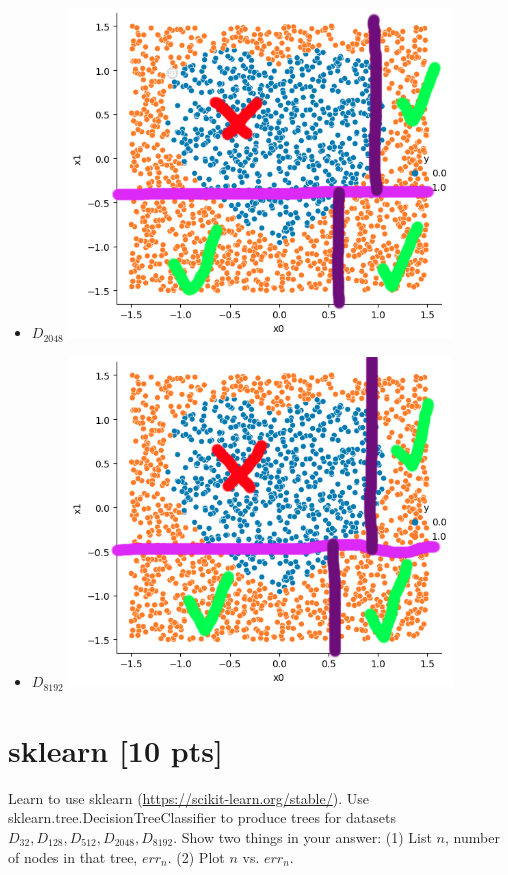 \documentclass[a4paper]{article}
\theoremstyle{definition}
\begin{document}
\begin{enumerate}
\begin{itemize}
\begin{itemize}
        \item $D_{2048}$ \includegraphics[width=0.8\textwidth]{hw2/2_7_3_4.png}\\
        \item $D_{8192}$ \includegraphics[width=0.8\textwidth]{hw2/2_7_3_5.png}\\
    \end{itemize}
  
  \end{itemize}
  
\end{enumerate}

\section{sklearn [10 pts]}
Learn to use sklearn (\url{https://scikit-learn.org/stable/}).
Use sklearn.tree.DecisionTreeClassifier to produce trees for datasets $D_{32}, D_{128}, D_{512}, D_{2048}, D_{8192}$.  Show two things in your answer: (1) List $n$, number of nodes in that tree, $err_n$. (2) Plot $n$ vs. $err_n$.
\end{document}
